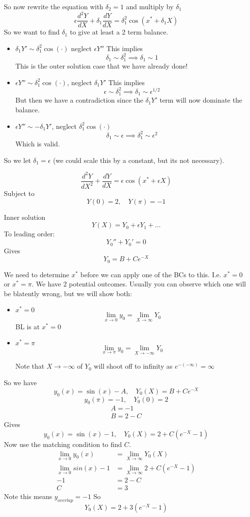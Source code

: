 \documentclass{X:/Documents/Coding/Latex/myassignment}
\begin{document}
So now rewrite the equation with $\delta_2 = 1$ and multiply by $\delta_1$
\[\epsilon \frac{d^2 Y}{dX} + \delta_1 \frac{dY}{dX} = \delta_1^2\cos(x^* + \delta_1 X)\]
So we want to find $\delta_1$ to give at least a 2 term balance. 
\begin{itemize}
    \item $\delta_1 Y' \sim \delta_1^2 \cos(\cdot) $ neglect $\epsilon Y''$
    This implies
    \[\delta_1 \sim  \delta_1^2 \implies \delta_1 \sim 1\]
    This is the outer solution case that we have already done!
    \item $\epsilon Y'' \sim \delta_1^2 \cos(\cdot)$, neglect $\delta_1 Y'$
    This implies
    \[\epsilon \sim \delta_1^2 \implies \delta_1 \sim \epsilon^{1/2}\]
    But then we have a contradiction since the $\delta_1 Y'$ term will now dominate the balance.
    \item $\epsilon Y'' \sim -\delta_1 Y'$, neglect $\delta_1^2 \cos(\cdot)$
    \[\delta_1 \sim \epsilon \implies \delta_1^2 \sim \epsilon^2\]
    Which is valid.

\end{itemize}
So we let $\delta_1 = \epsilon$ (we could scale this by a constant, but its not necessary).

\[\frac{d^2Y}{dX^2} + \frac{dY}{dX} = \epsilon \cos(x^* + \epsilon X)\]
Subject to 
\[Y(0) = 2,\quad Y(\pi) = -1\]

Inner solution
\[Y(X) = Y_0 + \epsilon Y_1 + \ldots\]
To leading order:
\[Y_0'' + Y_0' = 0\]
Gives
\[Y_0 = B + Ce^{-X}\]

We need to determine $x^*$ before we can apply one of the BCs to this.
I.e. $x^* = 0$ or $x^* = \pi$. We have 2 potential outcomes. Usually you can observe which one will be blatently wrong, but we will show both:

\begin{itemize}
    \item $x^* = 0$
    \[\lim_{x\to 0} y_0 = \lim_{X\to \infty} Y_0\]
    BL is at $x^* =0$

    \item $x^* = \pi$
    \[\lim_{x\to \pi}y_0 = \lim_{X\to -\infty} Y_0\]

Note that $X \to -\infty$ of $Y_0$ will shoot off to infinity as $e^{-(-\infty)} =\infty$
\end{itemize}



So we have
\[y_0(x) =\sin(x) -A ,\quad Y_0(X) = B + Ce^{-X}\]
\[y_0(\pi) = -1, \quad Y_0(0) = 2\]
\begin{align*}
    A = -1\\
    B = 2-C
\end{align*}
Gives
\[y_0(x) = \sin(x) -1,\quad Y_0(X) = 2 + C(e^{-X}-1)\]
Now use the matching condition to find $C$.
\begin{align*}
    \lim_{x\to 0} y_0(x) &= \lim_{X\to\infty} Y_0(X)\\
    \lim_{x\to 0} sin(x) -1&= \lim_{X\to\infty} 2 + C(e^{-X}-1)\\
    -1&= 2 - C\\
    C &= 3
\end{align*}
Note this means $y_{overlap} = -1$
So 
\[Y_0(X) = 2 + 3(e^{-X} -1)\]
\end{document}
